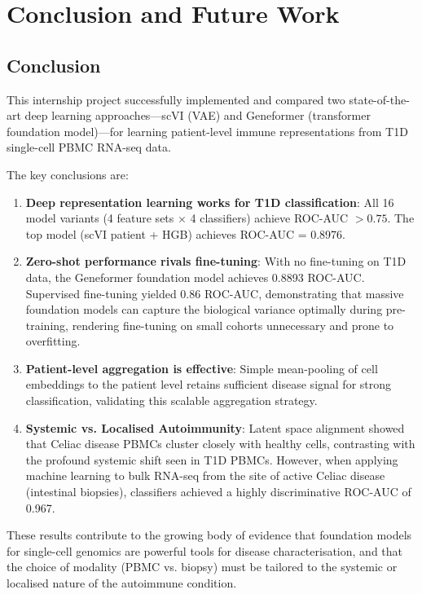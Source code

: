 \chapter{Conclusion and Future Work}
\label{chap:conclusion}

\section{Conclusion}

This internship project successfully implemented and compared two state-of-the-art deep learning approaches---scVI (VAE) and Geneformer (transformer foundation model)---for learning patient-level immune representations from T1D single-cell PBMC RNA-seq data.

The key conclusions are:

\begin{enumerate}
    \item \textbf{Deep representation learning works for T1D classification}: All 16 model variants (4 feature sets $\times$ 4 classifiers) achieve ROC-AUC $> 0.75$. The top model (scVI patient + HGB) achieves ROC-AUC = 0.8976.

    \item \textbf{Zero-shot performance rivals fine-tuning}: With no fine-tuning on T1D data, the Geneformer foundation model achieves 0.8893 ROC-AUC. Supervised fine-tuning yielded 0.86 ROC-AUC, demonstrating that massive foundation models can capture the biological variance optimally during pre-training, rendering fine-tuning on small cohorts unnecessary and prone to overfitting.

    \item \textbf{Patient-level aggregation is effective}: Simple mean-pooling of cell embeddings to the patient level retains sufficient disease signal for strong classification, validating this scalable aggregation strategy.

    \item \textbf{Systemic vs. Localised Autoimmunity}: Latent space alignment showed that Celiac disease PBMCs cluster closely with healthy cells, contrasting with the profound systemic shift seen in T1D PBMCs. However, when applying machine learning to bulk RNA-seq from the site of active Celiac disease (intestinal biopsies), classifiers achieved a highly discriminative ROC-AUC of 0.967.
\end{enumerate}

These results contribute to the growing body of evidence that foundation models for single-cell genomics are powerful tools for disease characterisation, and that the choice of modality (PBMC vs. biopsy) must be tailored to the systemic or localised nature of the autoimmune condition.

